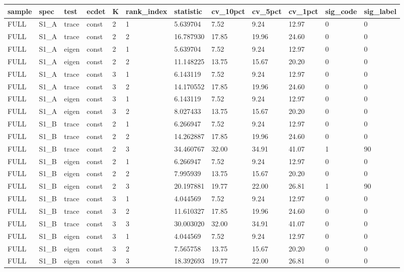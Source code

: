\begin{tabular}{llllllllllll}
\hline
sample & spec & test & ecdet & K & rank\_index & statistic & cv\_10pct & cv\_5pct & cv\_1pct & sig\_code & sig\_label \\
\hline
FULL & S1\_A & trace & const & 2 & 1 & 5.639704 & 7.52 & 9.24 & 12.97 & 0 & 0 \\
FULL & S1\_A & trace & const & 2 & 2 & 16.787930 & 17.85 & 19.96 & 24.60 & 0 & 0 \\
FULL & S1\_A & eigen & const & 2 & 1 & 5.639704 & 7.52 & 9.24 & 12.97 & 0 & 0 \\
FULL & S1\_A & eigen & const & 2 & 2 & 11.148225 & 13.75 & 15.67 & 20.20 & 0 & 0 \\
FULL & S1\_A & trace & const & 3 & 1 & 6.143119 & 7.52 & 9.24 & 12.97 & 0 & 0 \\
FULL & S1\_A & trace & const & 3 & 2 & 14.170552 & 17.85 & 19.96 & 24.60 & 0 & 0 \\
FULL & S1\_A & eigen & const & 3 & 1 & 6.143119 & 7.52 & 9.24 & 12.97 & 0 & 0 \\
FULL & S1\_A & eigen & const & 3 & 2 & 8.027433 & 13.75 & 15.67 & 20.20 & 0 & 0 \\
FULL & S1\_B & trace & const & 2 & 1 & 6.266947 & 7.52 & 9.24 & 12.97 & 0 & 0 \\
FULL & S1\_B & trace & const & 2 & 2 & 14.262887 & 17.85 & 19.96 & 24.60 & 0 & 0 \\
FULL & S1\_B & trace & const & 2 & 3 & 34.460767 & 32.00 & 34.91 & 41.07 & 1 & 90 \\
FULL & S1\_B & eigen & const & 2 & 1 & 6.266947 & 7.52 & 9.24 & 12.97 & 0 & 0 \\
FULL & S1\_B & eigen & const & 2 & 2 & 7.995939 & 13.75 & 15.67 & 20.20 & 0 & 0 \\
FULL & S1\_B & eigen & const & 2 & 3 & 20.197881 & 19.77 & 22.00 & 26.81 & 1 & 90 \\
FULL & S1\_B & trace & const & 3 & 1 & 4.044569 & 7.52 & 9.24 & 12.97 & 0 & 0 \\
FULL & S1\_B & trace & const & 3 & 2 & 11.610327 & 17.85 & 19.96 & 24.60 & 0 & 0 \\
FULL & S1\_B & trace & const & 3 & 3 & 30.003020 & 32.00 & 34.91 & 41.07 & 0 & 0 \\
FULL & S1\_B & eigen & const & 3 & 1 & 4.044569 & 7.52 & 9.24 & 12.97 & 0 & 0 \\
FULL & S1\_B & eigen & const & 3 & 2 & 7.565758 & 13.75 & 15.67 & 20.20 & 0 & 0 \\
FULL & S1\_B & eigen & const & 3 & 3 & 18.392693 & 19.77 & 22.00 & 26.81 & 0 & 0 \\

\end{tabular}
